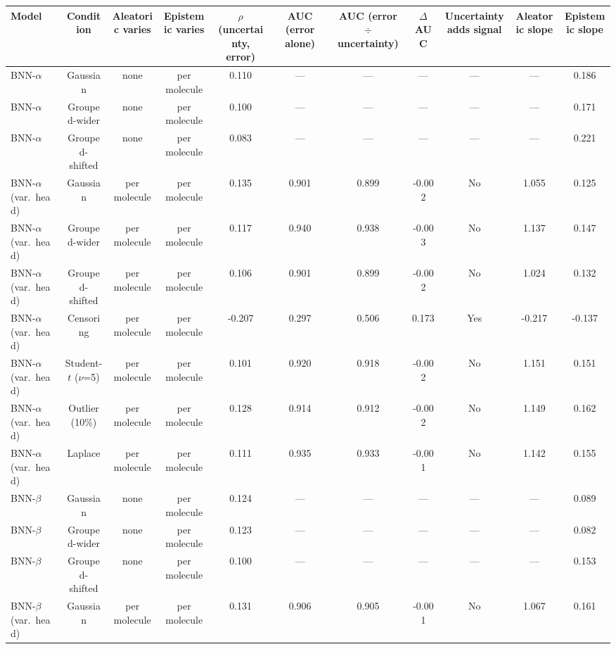 \begin{table}[!htbp]
\centering
\small
\begin{adjustbox}{max width=\textwidth,max totalheight=0.78\textheight}
\begin{tabular}{lcccccccccc}
\toprule
Model & Condition & Aleatoric varies & Epistemic varies & $\rho$(uncertainty, error) & AUC (error alone) & AUC (error $\div$ uncertainty) & $\Delta$ AUC & Uncertainty adds signal & Aleatoric slope & Epistemic slope \\
\midrule
BNN-$\alpha$ & Gaussian & none & per molecule & 0.110 & --- & --- & --- & --- & --- & 0.186 \\
BNN-$\alpha$ & Grouped-wider & none & per molecule & 0.100 & --- & --- & --- & --- & --- & 0.171 \\
BNN-$\alpha$ & Grouped-shifted & none & per molecule & 0.083 & --- & --- & --- & --- & --- & 0.221 \\
BNN-$\alpha$ (var.\ head) & Gaussian & per molecule & per molecule & 0.135 & 0.901 & 0.899 & -0.002 & No & 1.055 & 0.125 \\
BNN-$\alpha$ (var.\ head) & Grouped-wider & per molecule & per molecule & 0.117 & 0.940 & 0.938 & -0.003 & No & 1.137 & 0.147 \\
BNN-$\alpha$ (var.\ head) & Grouped-shifted & per molecule & per molecule & 0.106 & 0.901 & 0.899 & -0.002 & No & 1.024 & 0.132 \\
BNN-$\alpha$ (var.\ head) & Censoring & per molecule & per molecule & -0.207 & 0.297 & 0.506 & 0.173 & Yes & -0.217 & -0.137 \\
BNN-$\alpha$ (var.\ head) & Student-$t$ ($\nu$=5) & per molecule & per molecule & 0.101 & 0.920 & 0.918 & -0.002 & No & 1.151 & 0.151 \\
BNN-$\alpha$ (var.\ head) & Outlier (10\%) & per molecule & per molecule & 0.128 & 0.914 & 0.912 & -0.002 & No & 1.149 & 0.162 \\
BNN-$\alpha$ (var.\ head) & Laplace & per molecule & per molecule & 0.111 & 0.935 & 0.933 & -0.001 & No & 1.142 & 0.155 \\
BNN-$\beta$ & Gaussian & none & per molecule & 0.124 & --- & --- & --- & --- & --- & 0.089 \\
BNN-$\beta$ & Grouped-wider & none & per molecule & 0.123 & --- & --- & --- & --- & --- & 0.082 \\
BNN-$\beta$ & Grouped-shifted & none & per molecule & 0.100 & --- & --- & --- & --- & --- & 0.153 \\
BNN-$\beta$ (var.\ head) & Gaussian & per molecule & per molecule & 0.131 & 0.906 & 0.905 & -0.001 & No & 1.067 & 0.161 \\

\end{tabular}
\end{adjustbox}
\end{table}
